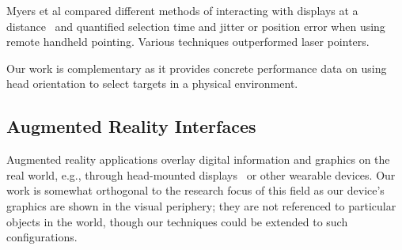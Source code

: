 Myers et al compared different methods of interacting with displays at a distance~\cite{myers_interacting_2002} and quantified selection time and jitter or position error when using remote handheld pointing. Various techniques outperformed laser pointers. 

Our work is complementary as it provides concrete performance data on using head orientation to select targets in a physical environment.


\subsection{Augmented Reality Interfaces}
Augmented reality applications overlay digital information and graphics on the real world, e.g., through head-mounted displays~\cite{azuma_recent_2001} or other wearable devices. 
Our work is somewhat orthogonal to the research focus of this field as our device's graphics are shown in the visual periphery; they are not referenced to particular objects in the world, though our techniques could be extended to such configurations.

